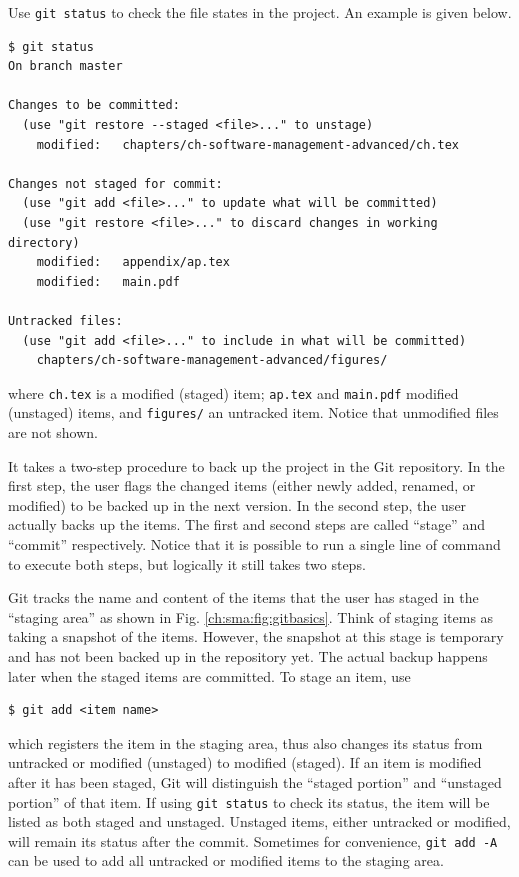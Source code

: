 Use \verb|git status| to check the file states in the project. An example is given below.
\begin{lstlisting}
$ git status
On branch master

Changes to be committed:
  (use "git restore --staged <file>..." to unstage)
	modified:   chapters/ch-software-management-advanced/ch.tex

Changes not staged for commit:
  (use "git add <file>..." to update what will be committed)
  (use "git restore <file>..." to discard changes in working directory)
	modified:   appendix/ap.tex
	modified:   main.pdf

Untracked files:
  (use "git add <file>..." to include in what will be committed)
	chapters/ch-software-management-advanced/figures/
\end{lstlisting}
where \verb|ch.tex| is a modified (staged) item; \verb|ap.tex| and \verb|main.pdf| modified (unstaged) items, and \verb|figures/| an untracked item. Notice that unmodified files are not shown.

It takes a two-step procedure to back up the project in the Git repository. In the first step, the user flags the changed items (either newly added, renamed, or modified) to be backed up in the next version. In the second step, the user actually backs up the items. The first and second steps are called ``stage'' and ``commit'' respectively. Notice that it is possible to run a single line of command to execute both steps, but logically it still takes two steps.

Git tracks the name and content of the items that the user has staged in the ``staging area'' as shown in Fig. \ref{ch:sma:fig:gitbasics}. Think of staging items as taking a snapshot of the items. However, the snapshot at this stage is temporary and has not been backed up in the repository yet. The actual backup happens later when the staged items are committed. To stage an item, use
\begin{lstlisting}
$ git add <item name>
\end{lstlisting}
which registers the item in the staging area, thus also changes its status from untracked or modified (unstaged) to modified (staged). If an item is modified after it has been staged, Git will distinguish the ``staged portion'' and ``unstaged portion'' of that item. If using \verb|git status| to check its status, the item will be listed as both staged and unstaged. Unstaged items, either untracked or modified, will remain its status after the commit. Sometimes for convenience, \verb|git add -A| can be used to add all untracked or modified items to the staging area.

